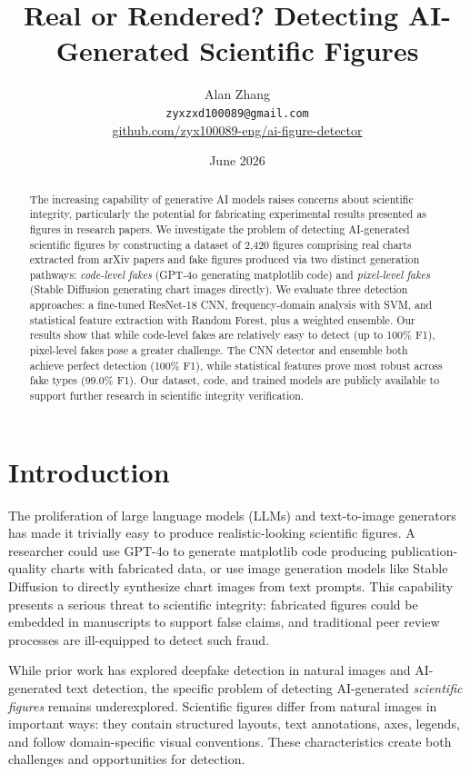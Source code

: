 \documentclass[11pt]{article}
\title{Real or Rendered? Detecting AI-Generated Scientific Figures}
\author{
  Alan Zhang \\
  \texttt{zyxzxd100089@gmail.com} \\
  \href{https://github.com/zyx100089-eng/ai-figure-detector}{github.com/zyx100089-eng/ai-figure-detector}
}
\date{June 2026}
\begin{document}
\maketitle

\begin{abstract}
The increasing capability of generative AI models raises concerns about scientific integrity, particularly the potential for fabricating experimental results presented as figures in research papers. We investigate the problem of detecting AI-generated scientific figures by constructing a dataset of 2,420 figures comprising real charts extracted from arXiv papers and fake figures produced via two distinct generation pathways: \textit{code-level fakes} (GPT-4o generating matplotlib code) and \textit{pixel-level fakes} (Stable Diffusion generating chart images directly). We evaluate three detection approaches: a fine-tuned ResNet-18 CNN, frequency-domain analysis with SVM, and statistical feature extraction with Random Forest, plus a weighted ensemble. Our results show that while code-level fakes are relatively easy to detect (up to 100\% F1), pixel-level fakes pose a greater challenge. The CNN detector and ensemble both achieve perfect detection (100\% F1), while statistical features prove most robust across fake types (99.0\% F1). Our dataset, code, and trained models are publicly available to support further research in scientific integrity verification.
\end{abstract}

\section{Introduction}

The proliferation of large language models (LLMs) and text-to-image generators has made it trivially easy to produce realistic-looking scientific figures. A researcher could use GPT-4o to generate matplotlib code producing publication-quality charts with fabricated data, or use image generation models like Stable Diffusion to directly synthesize chart images from text prompts. This capability presents a serious threat to scientific integrity: fabricated figures could be embedded in manuscripts to support false claims, and traditional peer review processes are ill-equipped to detect such fraud.

While prior work has explored deepfake detection in natural images and AI-generated text detection, the specific problem of detecting AI-generated \textit{scientific figures} remains underexplored. Scientific figures differ from natural images in important ways: they contain structured layouts, text annotations, axes, legends, and follow domain-specific visual conventions. These characteristics create both challenges and opportunities for detection.
\end{document}

